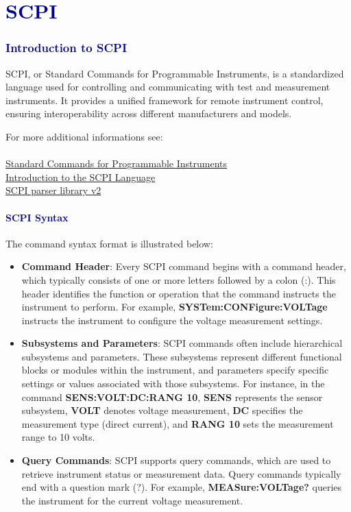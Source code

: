 \documentclass[10pt,a4paper]{article}
\begin{document}
\part*{\textcolor{darkblue}{SCPI}}

\section*{\textcolor{darkblue}{\textbf{Introduction to SCPI}}}

SCPI, or Standard Commands for Programmable Instruments, is a standardized language used for controlling
and communicating with test and measurement instruments. It provides a unified framework for remote instrument
control, ensuring interoperability across different manufacturers and models. 

For more additional informations see:\\~\\
\href{https://en.wikipedia.org/wiki/Standard_Commands_for_Programmable_Instruments}{Standard Commands for Programmable Instruments}\\
\href{https://rfmw.em.keysight.com/spdhelpfiles/33500/webhelp/us/content/__I_SCPI/00%20scpi_introduction.htm}{Introduction to the SCPI Language}\\
\href{https://www.jaybee.cz/scpi-parser/}{SCPI parser library v2}\\

\subsection*{\textcolor{darkblue}{\textbf{SCPI Syntax}}}
The command syntax format is illustrated below:
\begin{itemize}
    \item \textbf{Command Header}: Every SCPI command begins with a command header, which typically consists of one or more letters followed by a colon (:).
     This header identifies the function or operation that the command instructs the instrument to perform. For example, \textbf{SYSTem:CONFigure:VOLTage}
      instructs the instrument to configure the voltage measurement settings.
      \item \textbf{Subsystems and Parameters}: SCPI commands often include hierarchical subsystems and parameters. These subsystems represent different functional 
      blocks or modules within the instrument, and parameters specify specific settings or values associated with those subsystems. For instance, in the command
      \textbf{SENS:VOLT:DC:RANG 10}, \textbf{SENS} represents the sensor subsystem, \textbf{VOLT} denotes voltage measurement, \textbf{DC} specifies the measurement
      type (direct current), and \textbf{RANG 10} sets the measurement range to 10 volts.
    \item \textbf{Query Commands}: SCPI supports query commands, which are used to retrieve instrument status or measurement data. Query commands typically end with
     a question mark (?). For example, \textbf{MEASure:VOLTage?} queries the instrument for the current voltage measurement.
\end{itemize}
\end{document}
